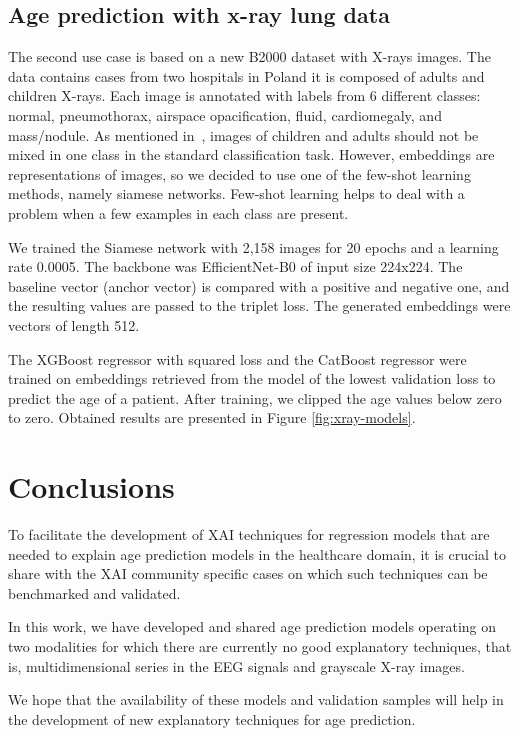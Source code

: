 \documentclass[letterpaper]{article} %
\begin{document}
\subsection{Age prediction with x-ray lung data}

The second use case is based on a new B2000 dataset with X-rays images. The data contains cases from two hospitals in Poland it is composed of adults and children X-rays. Each image is annotated with labels from 6 different classes: normal, pneumothorax, airspace opacification, fluid, cardiomegaly, and mass/nodule. As mentioned in~\cite{checklist}, images of children and adults should not be mixed in one class in the standard classification task. However, embeddings are representations of images, so we decided to use one of the few-shot learning methods, namely siamese networks. Few-shot learning helps to deal with a problem when a few examples in each class are present.

We trained the Siamese network with 2,158 images for 20 epochs and a learning rate 0.0005. The backbone was EfficientNet-B0 of input size 224x224. The baseline vector (anchor vector) is compared with a positive and negative one, and the resulting values are passed to the triplet loss. The generated embeddings were vectors of length 512.

The XGBoost regressor with squared loss and the CatBoost regressor were trained on embeddings retrieved from the model of the lowest validation loss to predict the age of a patient. After training, we clipped the age values below zero to zero. Obtained results are presented in Figure \ref{fig:xray-models}.

\section{Conclusions}

To facilitate the development of XAI techniques for regression models that are needed to explain age prediction models in the healthcare domain, it is crucial to share with the XAI community specific cases on which such techniques can be benchmarked and validated.

In this work, we have developed and shared age prediction models operating on two modalities for which there are currently no good explanatory techniques, that is, multidimensional series in the EEG signals and grayscale X-ray images.

We hope that the availability of these models and validation samples will help in the development of new explanatory techniques for age prediction.
\end{document}
